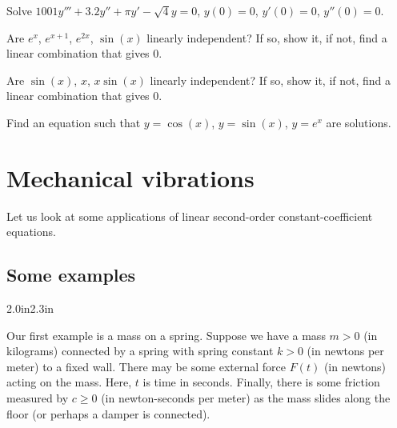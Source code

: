 \begin{exercise}
Solve $1001y'''+3.2y''+\pi y'-\sqrt{4} y = 0$, $y(0)=0$, $y'(0) = 0$,
$y''(0) = 0$.
\end{exercise}

\begin{exercise}
Are $e^{x}$, $e^{x+1}$, $e^{2x}$, $\sin(x)$ linearly independent?
If so, show it, if not, find a linear combination that gives $0$.
\end{exercise}

\begin{exercise}
Are $\sin(x)$, $x$, $x\sin(x)$ linearly independent?
If so, show it, if not, find a linear combination that gives $0$.
\end{exercise}

\begin{exercise}
Find an equation such that $y=\cos(x)$, $y=\sin(x)$, $y=e^x$ are solutions.
\end{exercise}


\sectionnewpage
\section{Mechanical vibrations} \label{sec:mv}



Let us look at some applications of linear second-order
constant-coefficient equations.

\subsection{Some examples}

\begin{mywrapfigsimp}{2.0in}{2.3in}
\noindent
{}
\end{mywrapfigsimp}
Our first example is a mass on a spring.  Suppose we have a mass $m > 0$
(in kilograms) connected
by a spring with spring constant $k > 0$ (in newtons per meter)
to a fixed wall.  There may be some external
force $F(t)$ (in newtons) acting on the mass.
Here, $t$ is time in seconds.  Finally, there is some
friction measured by $c \geq 0$ (in newton-seconds per meter) as the mass
slides along the floor (or perhaps a damper is connected).

